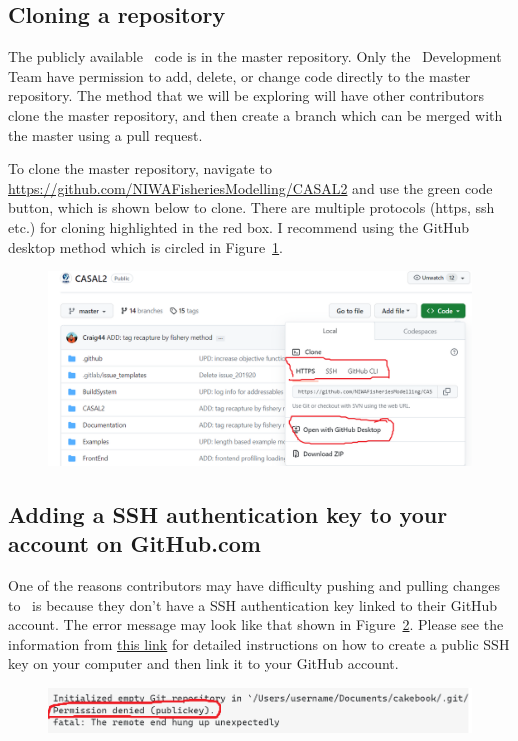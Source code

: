 \subsection{Cloning a repository}

The publicly available \CNAME\ code is in the master repository. Only the \CNAME\ Development Team have permission to add, delete, or change code directly to the master repository. The method that we will be exploring will have other contributors clone the master repository, and then create a branch which can be merged with the master using a pull request.

To clone the master repository, navigate to \url{https://github.com/NIWAFisheriesModelling/CASAL2} and use the green code button, which is shown below to clone. There are multiple protocols (https, ssh etc.) for cloning highlighted in the red box. I recommend using the GitHub desktop method which is circled in Figure~\ref{fig:clone}.

	

\begin{figure}[!ht]
	\centering
	\includegraphics[scale=0.6]{Figures/clone_repo.png}
	\caption{}\label{fig:clone}
\end{figure}


\subsection{Adding a SSH authentication key to your account on GitHub.com}

One of the reasons contributors may have difficulty pushing and pulling changes to \CNAME\ is because they don't have a SSH authentication key linked to their GitHub account. The error message may look like that shown in Figure~\ref{fig:permissiondenied}. Please see the information from \href{https://docs.github.com/en/authentication/connecting-to-github-with-ssh/adding-a-new-ssh-key-to-your-github-account}{this link} for detailed instructions on how to create a public SSH key on your computer and then link it to your GitHub account.

\begin{figure}[!ht]
	\centering
	\includegraphics[scale=0.6]{Figures/permissiondenied.png}
	\caption{}\label{fig:permissiondenied}
\end{figure}



